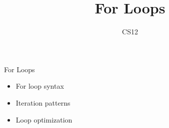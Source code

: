 \documentclass{beamer}
\title{For Loops}
\author{CS12}
\date{}
\begin{document}
\begin{frame}
    \titlepage
\end{frame}

\begin{frame}{For Loops}
    \begin{itemize}
        \item For loop syntax
        \item Iteration patterns
        \item Loop optimization
    \end{itemize}
\end{frame}
\end{document}
